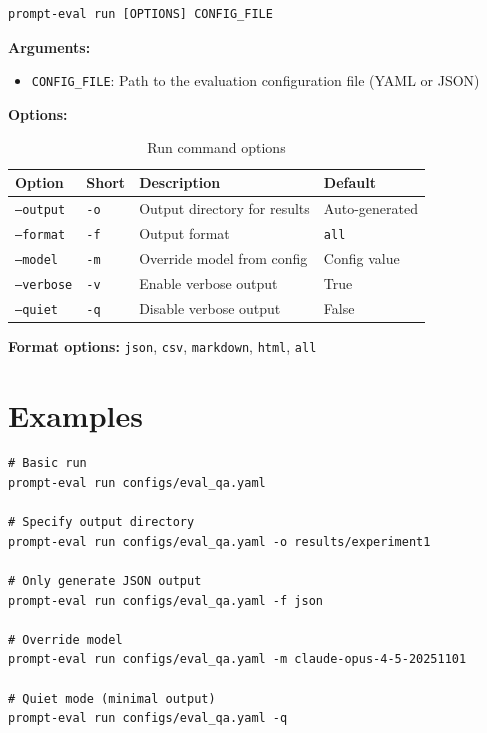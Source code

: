 \documentclass[11pt,a4paper]{report}
\begin{document}
\begin{lstlisting}[style=bash]
prompt-eval run [OPTIONS] CONFIG_FILE
\end{lstlisting}

\textbf{Arguments:}
\begin{itemize}
    \item \texttt{CONFIG\_FILE}: Path to the evaluation configuration file (YAML or JSON)
\end{itemize}

\textbf{Options:}

\begin{table}[h]
\centering
\begin{tabular}{@{}llp{5cm}l@{}}
\toprule
\textbf{Option} & \textbf{Short} & \textbf{Description} & \textbf{Default} \\
\midrule
\texttt{--output} & \texttt{-o} & Output directory for results & Auto-generated \\
\texttt{--format} & \texttt{-f} & Output format & \texttt{all} \\
\texttt{--model} & \texttt{-m} & Override model from config & Config value \\
\texttt{--verbose} & \texttt{-v} & Enable verbose output & True \\
\texttt{--quiet} & \texttt{-q} & Disable verbose output & False \\
\bottomrule
\end{tabular}
\caption{Run command options}
\end{table}

\textbf{Format options:} \texttt{json}, \texttt{csv}, \texttt{markdown}, \texttt{html}, \texttt{all}

\section{Examples}

\begin{lstlisting}[style=bash]
# Basic run
prompt-eval run configs/eval_qa.yaml

# Specify output directory
prompt-eval run configs/eval_qa.yaml -o results/experiment1

# Only generate JSON output
prompt-eval run configs/eval_qa.yaml -f json

# Override model
prompt-eval run configs/eval_qa.yaml -m claude-opus-4-5-20251101

# Quiet mode (minimal output)
prompt-eval run configs/eval_qa.yaml -q
\end{lstlisting}
\end{document}
